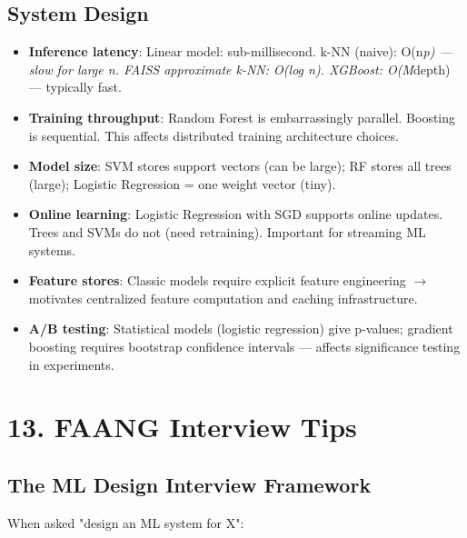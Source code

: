 \documentclass[11pt]{article}
\providecommand{\tightlist}{\setlength{\itemsep}{1pt}\setlength{\parskip}{0pt}}
\begin{document}
\subsection{System Design}\label{system-design}

\begin{itemize}
\tightlist
\item
  \textbf{Inference latency}: Linear model: sub-millisecond. k-NN (naive): O(n\emph{p) --- slow for large n. FAISS approximate k-NN: O(log n). XGBoost: O(M}depth) --- typically fast.
\item
  \textbf{Training throughput}: Random Forest is embarrassingly parallel. Boosting is sequential. This affects distributed training architecture choices.
\item
  \textbf{Model size}: SVM stores support vectors (can be large); RF stores all trees (large); Logistic Regression = one weight vector (tiny).
\item
  \textbf{Online learning}: Logistic Regression with SGD supports online updates. Trees and SVMs do not (need retraining). Important for streaming ML systems.
\item
  \textbf{Feature stores}: Classic models require explicit feature engineering \(\rightarrow\) motivates centralized feature computation and caching infrastructure.
\item
  \textbf{A/B testing}: Statistical models (logistic regression) give p-values; gradient boosting requires bootstrap confidence intervals --- affects significance testing in experiments.
\end{itemize}

\section{13. FAANG Interview Tips}\label{13-faang-interview-tips}

\subsection{The ML Design Interview Framework}\label{the-ml-design-interview-framework}

When asked "design an ML system for X":
\end{document}
